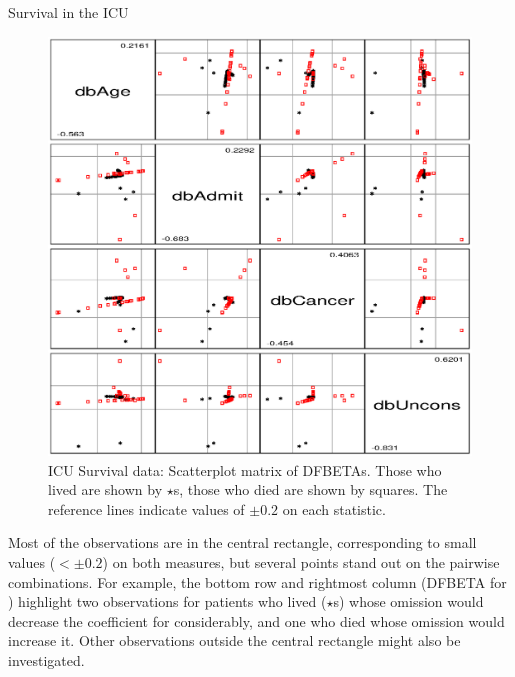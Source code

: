 \begin{Example}[icu2]{Survival in the ICU}
\begin{figure}[htb]
  \centering
  \includegraphics[scale=.75]{ch6/fig/icu4a}
  \caption[ICU Survival data: Scatterplot matrix of DFBETAs]{ICU Survival data: Scatterplot matrix of DFBETAs.  Those who lived are shown by $\star$s,  those who died are shown by squares.
  The reference lines indicate values of $\pm 0.2$ on each statistic.}%
  \label{fig:icu4a}
\end{figure}
Most of the observations are in the central rectangle, corresponding to
small values ($< \pm 0.2$) on both measures, but several points stand out
on the pairwise combinations.  For example, the bottom row and
rightmost column (DFBETA for )
highlight two observations for patients who lived ($\star$s)
whose omission would decrease the coefficient for 
considerably, and one who died whose omission would increase it.
Other observations outside the central rectangle might also be investigated.
\end{Example}
